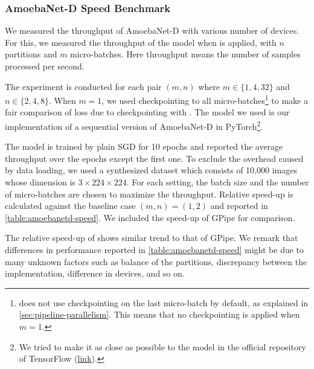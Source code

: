 
\subsubsection{AmoebaNet-D Speed Benchmark}
\label{subsubsec:amoebanetd-speed}
We measured the throughput of AmoebaNet-D with various number of devices. For this, we measured the throughput of the model when {\torchgpipe} is applied, with $n$ partitions and $m$ micro-batches. Here throughput means the number of samples processed per second. 

The experiment is conducted for each pair $(m, n)$ where $m \in \{1, 4, 32\}$ and $n \in \{2, 4, 8\}$. When $m=1$, we used checkpointing to all micro-batches\footnote{{\torchgpipe} does not use checkpointing on the last micro-batch by default, as explained in \autoref{sec:pipeline-parallelism}. This means that no checkpointing is applied when $m=1$.} to make a fair comparison of loss due to checkpointing with \cite{huang2019gpipe}. The model we used is our implementation of a sequential version of AmoebaNet-D in PyTorch\footnote{We tried to make it as close as possible to the model in the official repository of TensorFlow (\href{https://github.com/tensorflow/tpu/tree/master/models/official/amoeba_net}{link}).}.

The model is trained by plain SGD for 10 epochs and reported the average throughput over the epochs except the first one. To exclude the overhead caused by data loading, we used a synthesized dataset which consists of 10,000 images whose dimension is $3 \times 224 \times 224$. For each setting, the batch size and the number of micro-batches are chosen to maximize the throughput. Relative speed-up is calculated against the baseline case $(m, n) = (1, 2)$ and reported in \autoref{table:amoebanetd-speed}. We included the speed-up of GPipe for comparison. 

The relative speed-up of {\torchgpipe} shows similar trend to that of GPipe. We remark that differences in performance reported in \autoref{table:amoebanetd-speed} might be due to many unknown factors such as balance of the partitions, discrepancy between the implementation, difference in devices, and so on. 



